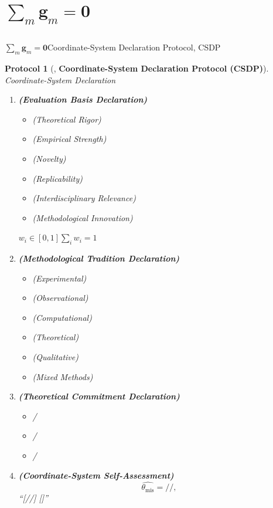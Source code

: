 \documentclass[12pt,a4paper]{article}
\newtheorem{protocol}[theorem]{Protocol}
\theoremstyle{remark}
\newcommand{\sumgd}{\sum_m \mathbf{g}_m = \mathbf{0}}
\newcommand{\misalignAngle}{\theta_{\text{mis}}}
\begin{document}
\section{$\sumgd$}
\label{sec:declaration_protocol}

\subsection{}

$\sumgd$\textbf{}Coordinate-System Declaration Protocol, CSDP

\begin{protocol}[, \textbf{Coordinate-System Declaration Protocol (CSDP)}]
\label{prot:CSDP}
\textbf{}Coordinate-System Declaration

\begin{enumerate}[label=\textbf{CS\arabic*}, leftmargin=*]
    \item \textbf{ (Evaluation Basis Declaration)}
    \begin{itemize}
        \item  (Theoretical Rigor)
        \item  (Empirical Strength)  
        \item  (Novelty)
        \item  (Replicability)
        \item  (Interdisciplinary Relevance)
        \item  (Methodological Innovation)
    \end{itemize}
    $w_i \in [0,1]$$\sum_i w_i = 1$
    
    \item \textbf{ (Methodological Tradition Declaration)}
    \begin{itemize}
        \item  (Experimental)
        \item  (Observational)
        \item  (Computational)
        \item  (Theoretical)
        \item  (Qualitative)
        \item  (Mixed Methods)
    \end{itemize}
    
    \item \textbf{ (Theoretical Commitment Declaration)}
    \begin{itemize}
        \item  / 
        \item  / 
        \item  / 
    \end{itemize}
    
    \item \textbf{ (Coordinate-System Self-Assessment)}
    \begin{equation}
        \widehat{\misalignAngle} = \text{//},
        \label{eq:self_assessed_alignment}
    \end{equation}
    “[//] []”
\end{enumerate}
\end{protocol}
\end{document}
